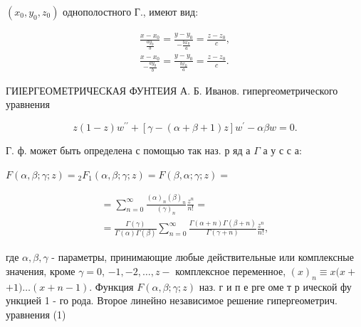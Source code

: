 \documentclass[10pt]{article}
\begin{document}
$\left(x_{0}, y_{0}, z_{0}\right)$ однополостного Г., имеют вид:



\[

\begin{gathered}

\frac{x-x_{0}}{\frac{a y_{0}}{b}}=\frac{y-y_{0}}{-\frac{b x_{0}}{a}}=\frac{z-z_{0}}{c}, \\

\frac{x-x_{0}}{-\frac{a y_{0}}{b}}=\frac{y-y_{0}}{\frac{b x_{0}}{a}}=\frac{z-z_{0}}{c} .

\end{gathered}

\]



ГИІЕРГЕОМЕТРИЧЕСКАЯ ФУНТЕИЯ А. Б. Иванов. гипергеометрического уравнения



\[

z(1-z) w^{\prime \prime}+[\gamma-(\alpha+\beta+1) z] w^{\prime}-\alpha \beta w=0 .

\]



Г. ф. может быть определена с помощью так наз. р яд а $\Gamma$ а у с с а:



$F(\alpha, \beta ; \gamma ; z)={ }_{2} F_{1}(\alpha, \beta ; \gamma ; z)=F(\beta, \alpha ; \gamma ; z)=$



\[

\begin{gathered}

=\sum_{n=0}^{\infty} \frac{(\alpha)_{n}(\beta)_{n}}{(\gamma)_{n}} \frac{z^{n}}{n !}= \\

=\frac{\Gamma(\gamma)}{\Gamma(\alpha) \Gamma(\beta)} \sum_{n=0}^{\infty} \frac{\Gamma(\alpha+n) \Gamma(\beta+n)}{\Gamma(\gamma+n)} \frac{z^{n}}{n !},

\end{gathered}

\]



где $\alpha, \beta, \gamma$ - параметры, принимающие любые действительные или комплексные значения, кроме $\gamma=0$, $-1,-2, \ldots, z-$ комплексное переменное, $(x)_{n} \equiv x(x+$ $+1) \ldots(x+n-1)$. Функция $F(\alpha, \beta ; \gamma ; z)$ наз. г и п е рге оме т р ической фу ункцией 1 - го рода. Второе линейно независимое решение гипергеометрич. уравнения (1)
\end{document}
